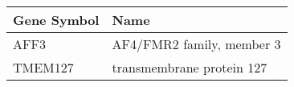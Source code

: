 \begin{tabular}{ll}
\toprule
Gene Symbol &                      Name \\
\midrule
       AFF3 & AF4/FMR2 family, member 3 \\
    TMEM127 & transmembrane protein 127 \\
\bottomrule
\end{tabular}
